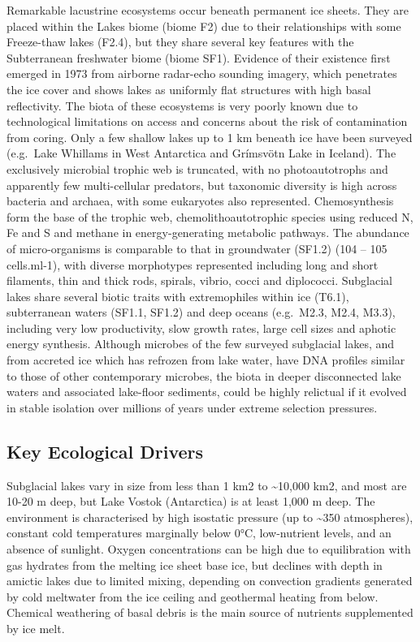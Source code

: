 \documentclass[
  letterpaper,
  DIV=11,
  numbers=noendperiod]{scrartcl}
\begin{document}
Remarkable lacustrine ecosystems occur beneath permanent ice sheets.
They are placed within the Lakes biome (biome F2) due to their
relationships with some Freeze-thaw lakes (F2.4), but they share several
key features with the Subterranean freshwater biome (biome SF1).
Evidence of their existence first emerged in 1973 from airborne
radar-echo sounding imagery, which penetrates the ice cover and shows
lakes as uniformly flat structures with high basal reflectivity. The
biota of these ecosystems is very poorly known due to technological
limitations on access and concerns about the risk of contamination from
coring. Only a few shallow lakes up to 1 km beneath ice have been
surveyed (e.g.~Lake Whillams in West Antarctica and Grímsvötn Lake in
Iceland). The exclusively microbial trophic web is truncated, with no
photoautotrophs and apparently few multi-cellular predators, but
taxonomic diversity is high across bacteria and archaea, with some
eukaryotes also represented. Chemosynthesis form the base of the trophic
web, chemolithoautotrophic species using reduced N, Fe and S and methane
in energy-generating metabolic pathways. The abundance of
micro-organisms is comparable to that in groundwater (SF1.2) (104 -- 105
cells.ml-1), with diverse morphotypes represented including long and
short filaments, thin and thick rods, spirals, vibrio, cocci and
diplococci. Subglacial lakes share several biotic traits with
extremophiles within ice (T6.1), subterranean waters (SF1.1, SF1.2) and
deep oceans (e.g.~M2.3, M2.4, M3.3), including very low productivity,
slow growth rates, large cell sizes and aphotic energy synthesis.
Although microbes of the few surveyed subglacial lakes, and from
accreted ice which has refrozen from lake water, have DNA profiles
similar to those of other contemporary microbes, the biota in deeper
disconnected lake waters and associated lake-floor sediments, could be
highly relictual if it evolved in stable isolation over millions of
years under extreme selection pressures.

\subsection{Key Ecological Drivers}\label{key-ecological-drivers-117}

Subglacial lakes vary in size from less than 1 km2 to
\textasciitilde10,000 km2, and most are 10-20 m deep, but Lake Vostok
(Antarctica) is at least 1,000 m deep. The environment is characterised
by high isostatic pressure (up to \textasciitilde350 atmospheres),
constant cold temperatures marginally below 0°C, low-nutrient levels,
and an absence of sunlight. Oxygen concentrations can be high due to
equilibration with gas hydrates from the melting ice sheet base ice, but
declines with depth in amictic lakes due to limited mixing, depending on
convection gradients generated by cold meltwater from the ice ceiling
and geothermal heating from below. Chemical weathering of basal debris
is the main source of nutrients supplemented by ice melt.
\end{document}
